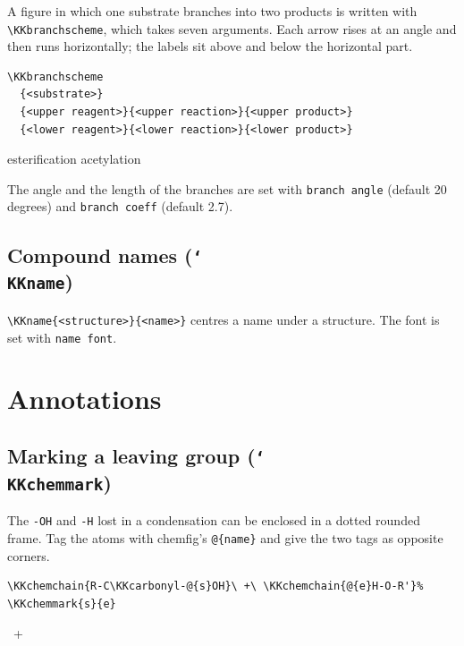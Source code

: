 \documentclass[paper=a4paper,fontsize=10pt]{jlreq}
\begin{document}
A figure in which one substrate branches into two products is written with
\verb|\KKbranchscheme|, which takes seven arguments. Each arrow rises at an
angle and then runs horizontally; the labels sit above and below the horizontal
part.

\begin{verbatim}
\KKbranchscheme
  {<substrate>}
  {<upper reagent>}{<upper reaction>}{<upper product>}
  {<lower reagent>}{<lower reaction>}{<lower product>}
\end{verbatim}

\KKbranchscheme
  {}
  {}{esterification}{}
  {}{acetylation}{}

The angle and the length of the branches are set with \verb|branch angle|
(default 20 degrees) and \verb|branch coeff| (default 2.7).

\subsection{Compound names (\texttt{\char`\\KKname})}

\verb|\KKname{<structure>}{<name>}| centres a name under a structure. The font is
set with \verb|name font|.

\section{Annotations}

\subsection{Marking a leaving group (\texttt{\char`\\KKchemmark})}

The \verb|-OH| and \verb|-H| lost in a condensation can be enclosed in a dotted
rounded frame. Tag the atoms with \textsf{chemfig}'s \verb|@{name}| and give the
two tags as opposite corners.

\begin{verbatim}
\KKchemchain{R-C\KKcarbonyl-@{s}OH}\ +\ \KKchemchain{@{e}H-O-R'}%
\KKchemmark{s}{e}
\end{verbatim}

\begin{center}
\ +\ %
\end{center}
\end{document}
